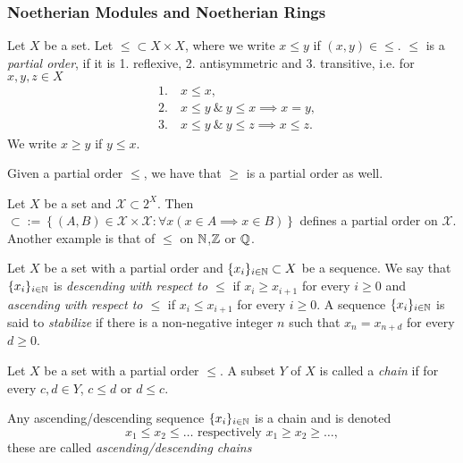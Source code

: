 \subsubsection{Noetherian Modules and Noetherian Rings}
\begin{definition}
    Let $X$ be a set. Let $\leq \subset X\times X$, where we write $x\leq y$ if $(x,y)\in \leq$. $\leq$ is a \textit{partial order}, if it is 1. reflexive, 
 2. antisymmetric and 3. transitive, i.e. for $x,y,z \in X$ 
 \begin{align*}
     &1. \quad x\leq x,\\
     &2. \quad x \leq y \ \& \ y \leq x \implies x = y,\\
     &3. \quad x \leq y \ \& \ y \leq z \implies x \leq z.
 \end{align*}
 We write $x\geq y$ if $y\leq x$.
\end{definition}
\begin{remark}
    Given a partial order $\leq$, we have that $\geq$ is a partial order as well.
\end{remark}
\begin{example}
    Let $X$ be a set and $\mathcal{X}\subset 2^X$. Then $\subset := \left\{(A,B)\in \mathcal{X}\times \mathcal{X} : \forall x(x\in A \implies x\in B) \right\}$ defines a partial order on $\mathcal{X}$.\\
    Another example is that of $\leq$ on $\mathbb{N}$,$\mathbb{Z}$ or $\mathbb{Q}$. 
\end{example}
\begin{definition}
    Let $X$ be a set with a partial order and $\{x_i\}_{i\in \mathbb{N}} \subset X$ be a sequence. We say that $\{x_i\}_{i\in\mathbb{N}}$ is \textit{descending with respect to $\leq$} if $x_i \geq x_{i+1}$ for every $i\geq 0$ and \textit{ascending with respect to $\leq$} if $x_i \leq x_{i+1}$ for every $i\geq 0$. A sequence $\{x_i\}_{i\in \mathbb{N}}$ is said to \textit{stabilize} if there is a non-negative integer $n$ such that $x_n = x_{n+d}$ for every $d\geq 0$. 
\end{definition}
\begin{definition}
    Let $X$ be a set with a partial order $\leq$. A subset $Y$ of $X$ is called a \textit{chain} if for every $c,d\in Y$, $c\leq d$ or $d\leq c$.  
\end{definition}
\begin{remark}
    Any ascending/descending sequence $\{x_i\}_{i\in \mathbb{N}}$ is a chain and is denoted 
    $$x_1\leq x_2\leq \dots \text{ respectively } x_1\geq x_2 \geq \dots,$$
    these are called \textit{ascending/descending chains}
\end{remark}
